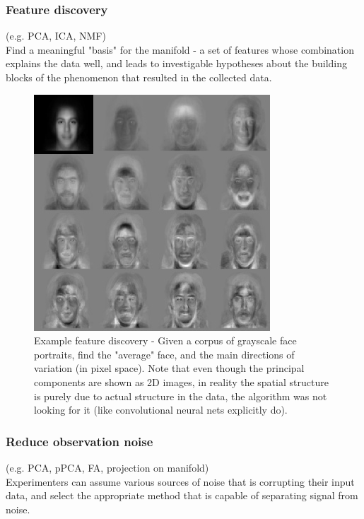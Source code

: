 \documentclass[11pt]{article}
\begin{document}
\clearpage

 
\subsubsection{Feature discovery} 
(e.g. PCA, ICA, NMF) \\ Find a meaningful "basis" for the manifold - a set of features whose combination explains the data well, and leads to investigable hypotheses about the building blocks of the phenomenon that resulted in the collected data. 
 

\begin{figure}[h!]
\centering
\includegraphics[width=0.5\linewidth]{eigfacessmall}
\caption{Example feature discovery - Given a corpus of grayscale face portraits, find the "average" face, and the main directions of variation (in pixel space). Note that even though the principal components are shown as 2D images, in reality the spatial structure is purely due to actual structure in the data, the algorithm was not looking for it (like convolutional neural nets explicitly do). }
\end{figure} 

\clearpage

 
\subsubsection{Reduce observation noise} (e.g. PCA, pPCA, FA, projection on manifold) \\ Experimenters can assume various sources of noise that is corrupting their input data, and select the appropriate method that is capable of separating signal from noise.
 
\end{document}
